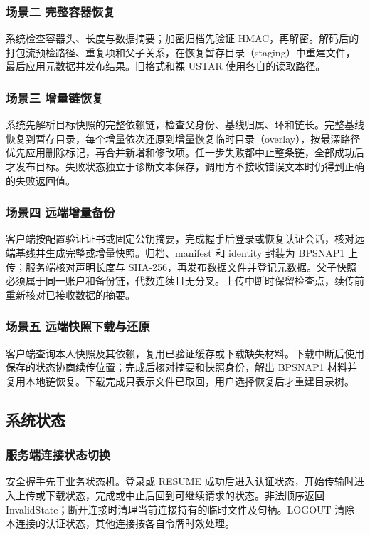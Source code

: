 \subsubsection{场景二 完整容器恢复}
系统检查容器头、长度与数据摘要；加密归档先验证 HMAC，再解密。解码后的打包流预检路径、重复项和父子关系，在恢复暂存目录（staging）中重建文件，最后应用元数据并发布结果。旧格式和裸 USTAR 使用各自的读取路径。

\subsubsection{场景三 增量链恢复}
系统先解析目标快照的完整依赖链，检查父身份、基线归属、环和链长。完整基线恢复到暂存目录，每个增量依次还原到增量恢复临时目录（overlay），按最深路径优先应用删除标记，再合并新增和修改项。任一步失败都中止整条链，全部成功后才发布目标。失败状态独立于诊断文本保存，调用方不接收错误文本时仍得到正确的失败返回值。

\subsubsection{场景四 远端增量备份}
客户端按配置验证证书或固定公钥摘要，完成握手后登录或恢复认证会话，核对远端基线并生成完整或增量快照。归档、manifest 和 identity 封装为 BPSNAP1 上传；服务端核对声明长度与 SHA-256，再发布数据文件并登记元数据。父子快照必须属于同一账户和备份链，代数连续且无分叉。上传中断时保留检查点，续传前重新核对已接收数据的摘要。

\subsubsection{场景五 远端快照下载与还原}
客户端查询本人快照及其依赖，复用已验证缓存或下载缺失材料。下载中断后使用保存的状态协商续传位置；完成后核对摘要和快照身份，解出 BPSNAP1 材料并复用本地链恢复。下载完成只表示文件已取回，用户选择恢复后才重建目录树。

\subsection{系统状态}
\subsubsection{服务端连接状态切换}
安全握手先于业务状态机。登录或 RESUME 成功后进入认证状态，开始传输时进入上传或下载状态，完成或中止后回到可继续请求的状态。非法顺序返回 InvalidState；断开连接时清理当前连接持有的临时文件及句柄。LOGOUT 清除本连接的认证状态，其他连接按各自令牌时效处理。

